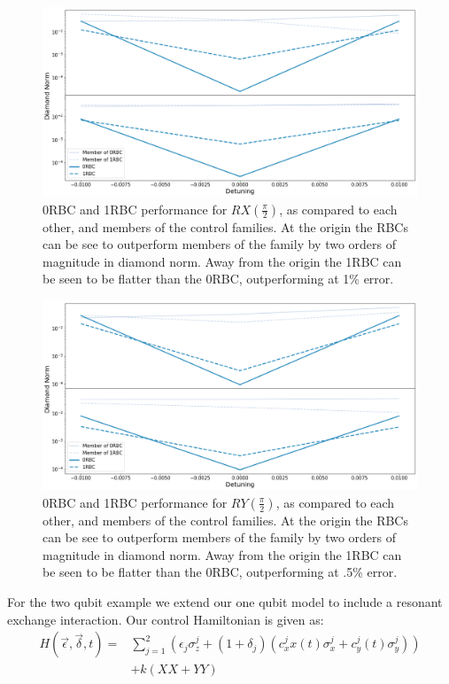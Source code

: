 \documentclass[aps,nofootinbib,pra,notitlepage,twocolumn]{revtex4-1}
\begin{document}
\begin{figure}[htb]
  \centering
  \includegraphics[scale=.2]{figures/SQRTX}

\caption{0RBC and 1RBC performance for $RX(\frac{\pi}{2})$, as compared to each other, and members of the control families. At the origin the RBCs can be see to outperform members of the family by two orders of magnitude in diamond norm. Away from the origin the 1RBC can be seen to be flatter than the 0RBC, outperforming at 1\% error.}
\end{figure}
\begin{figure}[htb]
  \centering
  \includegraphics[scale=.2]{figures/SQRTY}
\caption{0RBC and 1RBC performance for $RY(\frac{\pi}{2})$, as compared to each other, and members of the control families. At the origin the RBCs can be see to outperform members of the family by two orders of magnitude in diamond norm. Away from the origin the 1RBC can be seen to be flatter than the 0RBC, outperforming at .5\% error.}
\end{figure}

For the two qubit example we extend our one qubit model to include a resonant exchange interaction. Our control Hamiltonian is given as:
\begin{equation} \label{eq:2Qham}
\begin{split}
H(\vec{\epsilon}, \vec{\delta}, t) = &\sum_{j=1}^2(\epsilon_j\sigma_z^j + (1 + \delta_j)(c_x^jx(t)\sigma_x^j + c_y^j(t)\sigma_y^j)) \\
&+ k(XX + YY)
\end{split}
\end{equation}
\end{document}
